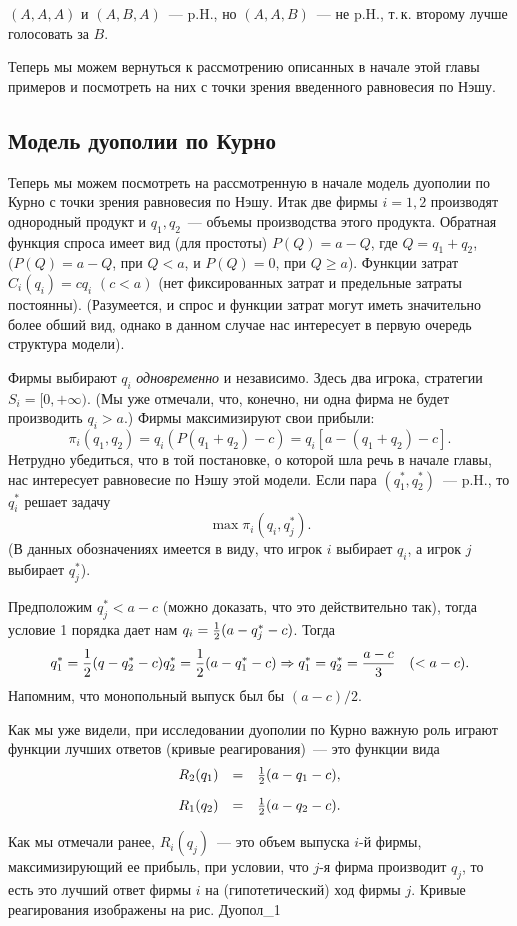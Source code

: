 {$(A,A,A)$ и $(A,B,A)$~--- p.H.,  но $(A,A,B)$~--- не p.H., т.\,к.
второму лучше голосовать за $B$.

Теперь мы можем вернуться к рассмотрению описанных в начале этой
главы примеров и посмотреть на них с точки зрения введенного
равновесия по Нэшу.

\subsection{Модель дуополии по Курно}


Теперь мы можем посмотреть на рассмотренную в начале модель
дуополии по Курно с точки зрения равновесия по Нэшу.
Итак две фирмы $i=1,2$ производят однородный продукт и $q_1,q_2$~---
объемы производства этого продукта. Обратная функция спроса имеет
вид (для простоты) $P(Q)=a-Q$, где $Q=q_1+q_2$, $(P(Q)=a-Q$, при
$Q<a$, и $P(Q)=0$, при $Q\ge a$).  Функции затрат $C_i(q_i)=cq_i$
$(c<a)$ (нет фиксированных затрат и предельные затраты постоянны).
(Разумеется, и спрос и функции затрат могут иметь значительно более
обший вид, однако в данном случае нас интересует в первую очередь
структура модели).

Фирмы выбирают $q_i$ {\it одновременно} и независимо. Здесь два
игрока, стратегии $S_i=[0,+\infty)$. (Мы уже отмечали, что, конечно,
ни одна фирма не будет производить $q_i>a$.) Фирмы максимизируют
свои прибыли:
$$
\pi_i(q_1,q_2)=q_i(P(q_1+q_2)-c)=q_i[a-(q_1+q_2)-c].
$$
Нетрудно убедиться, что в той постановке, о которой шла речь в
начале главы, нас интересует равновесие по Нэшу этой модели. Если
пара $(q^*_1,q^*_2)$~--- p.H., то $q^*_i$ решает задачу
$$
\max\pi_i(q_i,q^*_j).
$$
(В данных обозначениях имеется в виду, что игрок $i$ выбирает $q_i$,
а игрок $j$ выбирает $q^*_j$).


Предположим $q^*_j<a-c$ (можно доказать, что это действительно так),
тогда условие 1 порядка дает нам
$q_i={1\over 2}(a-q^*_j-c)$. Тогда
$$
{q^*_1={1\over 2}(q-q^*_2-c) q^*_2={1\over
2}(a-q^*_1-c)}\Rightarrow q^*_1=q^*_2={{a-c}\over 3}\quad (<a-c).
$$
Напомним, что монопольный выпуск был бы $(a-c)/2$.

Как мы уже видели, при исследовании дуополии по Курно важную роль
играют функции лучших ответов (кривые реагирования)~--- это функции
вида
$$
\begin{array}{rcl}
R_2(q_1)&=&{1\over 2}(a-q_1-c),\\[10pt]
R_1(q_2)&=&{1\over 2}(a-q_2-c). \end{array}
$$

Как мы отмечали ранее, $R_i(q_j)$~--- это объем выпуска $i$-й фирмы,
максимизирующий ее прибыль, при условии, что $j$-я фирма производит
$q_j$, то есть это лучший ответ фирмы $i$ на (гипотетический) ход фирмы $j$.
Кривые реагирования изображены на рис. Дуопол_1


}

